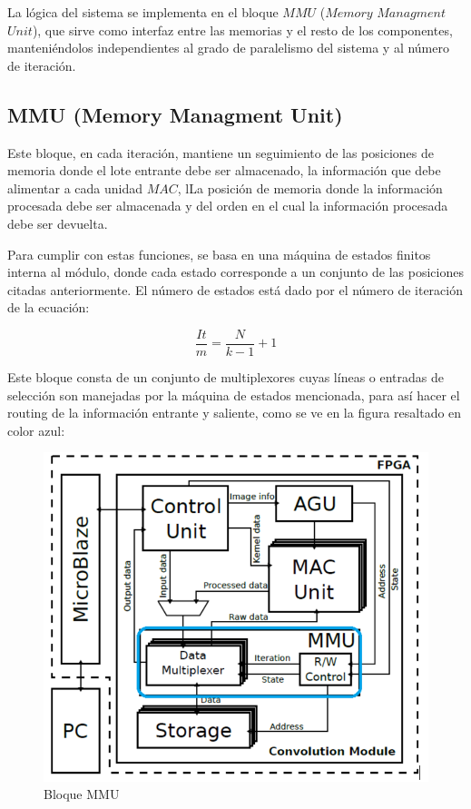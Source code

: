 \documentclass[]{IEEEphot}
\begin{document}
La lógica del sistema se implementa en el bloque $MMU$ ($Memory$ $Managment$ $Unit$), que sirve como interfaz entre las memorias y el resto de los componentes, 
manteniéndolos independientes al grado de paralelismo del sistema y al número de iteración.

\bigskip

\subsection {MMU (Memory Managment Unit) }  \label{mmu_subsecc}
Este bloque, en cada iteración, mantiene un seguimiento de las posiciones de memoria donde el lote entrante debe ser almacenado,
la información que debe alimentar a cada unidad $MAC$, lLa posición de memoria donde la información procesada debe ser almacenada
y del orden en el cual la información procesada debe ser devuelta.

Para cumplir con estas funciones, se basa en una máquina de estados finitos interna al módulo, donde cada estado corresponde a un conjunto de las posiciones citadas anteriormente.
El número de estados está dado por el número de iteración de la ecuación:

\begin{equation}\label{niter}
  \frac{It}{m} = \frac{N}{k-1} + 1
\end{equation}
\bigskip

Este bloque consta de un conjunto de multiplexores cuyas líneas o entradas de selección son manejadas por la máquina de estados mencionada, para así hacer el routing de la información entrante y saliente, como se ve en la figura resaltado en color azul:
\begin{figure}[H]
\centering
\includegraphics[scale=0.8]{arq_blue.png}
\caption{Bloque MMU}
\label{mmu_location}
\end{figure}
\end{document}
